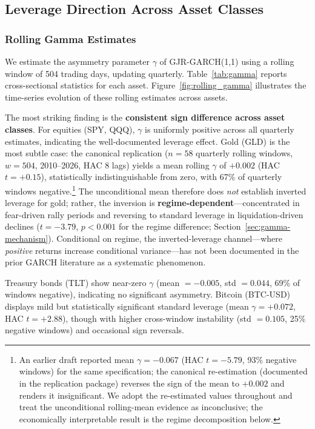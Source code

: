 \subsection{Leverage Direction Across Asset Classes}
\label{sec:leverage_direction}

\subsubsection{Rolling Gamma Estimates}

We estimate the asymmetry parameter $\gamma$ of GJR-GARCH(1,1) using a rolling window of 504 trading days, updating quarterly. Table~\ref{tab:gamma} reports cross-sectional statistics for each asset. Figure~\ref{fig:rolling_gamma} illustrates the time-series evolution of these rolling estimates across assets.

The most striking finding is the \textbf{consistent sign difference across asset classes}. For equities (SPY, QQQ), $\gamma$ is uniformly positive across all quarterly estimates, indicating the well-documented leverage effect. Gold (GLD) is the most subtle case: the canonical replication ($n = 58$ quarterly rolling windows, $w = 504$, 2010--2026, HAC 8 lags) yields a mean rolling $\gamma$ of $+0.002$ (HAC $t = +0.15$), statistically indistinguishable from zero, with 67\% of quarterly windows negative.\footnote{An earlier draft reported mean $\gamma = -0.067$ (HAC $t = -5.79$, 93\% negative windows) for the same specification; the canonical re-estimation (documented in the replication package) reverses the sign of the mean to $+0.002$ and renders it insignificant. We adopt the re-estimated values throughout and treat the unconditional rolling-mean evidence as inconclusive; the economically interpretable result is the regime decomposition below.} The unconditional mean therefore does \emph{not} establish inverted leverage for gold; rather, the inversion is \textbf{regime-dependent}---concentrated in fear-driven rally periods and reversing to standard leverage in liquidation-driven declines ($t = -3.79$, $p < 0.001$ for the regime difference; Section~\ref{sec:gamma-mechanism}). Conditional on regime, the inverted-leverage channel---where \textit{positive} returns increase conditional variance---has not been documented in the prior GARCH literature as a systematic phenomenon.

Treasury bonds (TLT) show near-zero $\gamma$ (mean $= -0.005$, std $= 0.044$, 69\% of windows negative), indicating no significant asymmetry. Bitcoin (BTC-USD) displays mild but statistically significant standard leverage (mean $\gamma = +0.072$, HAC $t = +2.88$), though with higher cross-window instability (std $= 0.105$, 25\% negative windows) and occasional sign reversals.

